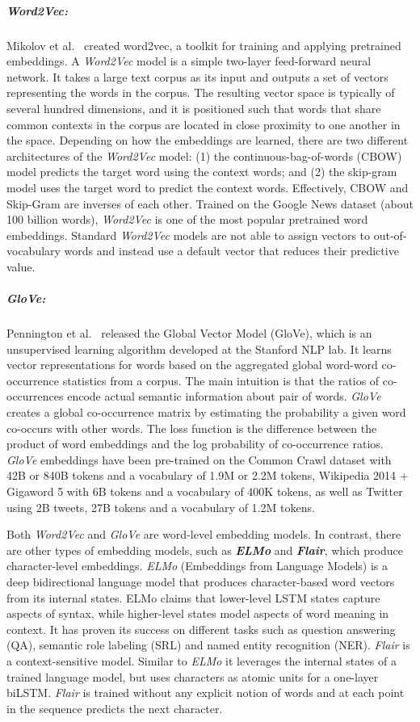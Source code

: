 \subparagraph{\emph{Word2Vec:}} Mikolov et al.~\cite{w2v2013} created word2vec, a toolkit for training and applying pretrained embeddings. A \emph{Word2Vec} model is a simple two-layer feed-forward neural network. It takes a large text corpus as its input and outputs a set of vectors representing the words in the corpus. The resulting vector space is typically of several hundred dimensions, and it is positioned such that words that share common contexts in the corpus are located in close proximity to one another in the space. Depending on how the embeddings are learned, there are two different architectures of the \emph{Word2Vec} model: (1) the continuous-bag-of-words (CBOW) model predicts the target word using the context words; and (2) the skip-gram model uses the target word to predict the context words. Effectively, CBOW and Skip-Gram are inverses of each other. Trained on the Google News dataset (about 100 billion words), \emph{Word2Vec} is one of the most popular pretrained word embeddings. Standard \emph{Word2Vec} models are not able to assign vectors to out-of-vocabulary words and instead use a default vector that reduces their predictive value.

\subparagraph{\emph{GloVe:}} Pennington et al.~\cite{glove2014} released the Global Vector Model (GloVe), which is an unsupervised learning algorithm developed at the Stanford NLP lab. It learns vector representations for words based on the aggregated global word-word co-occurrence statistics from a corpus. The main intuition is that the ratios of co-occurrences encode actual semantic information about pair of words. \emph{GloVe} creates a global co-occurrence matrix by estimating the probability a given word co-occurs with other words. The loss function is the difference between the product of word embeddings and the log probability of co-occurrence ratios. \emph{GloVe} embeddings have been pre-trained on the Common Crawl dataset with 42B or 840B tokens and a vocabulary of 1.9M or 2.2M tokens, Wikipedia 2014 + Gigaword 5 with 6B tokens and a vocabulary of 400K tokens, as well as Twitter using 2B tweets, 27B tokens and a vocabulary of 1.2M tokens.


Both \emph{Word2Vec} and \emph{GloVe} are word-level embedding models. In contrast, there are other types of embedding models, such as \textbf{\emph{ELMo}} and \textbf{\emph{Flair}}, which produce character-level embeddings. \emph{ELMo} (Embeddings from Language Models) \cite{elmo2018} is a deep bidirectional language model that produces character-based word vectors from its internal states. ELMo claims that lower-level LSTM states capture aspects of syntax, while higher-level states model aspects of word meaning in context. It has proven its success on different tasks such as question answering (QA), semantic role labeling (SRL) and named entity recognition (NER). \emph{Flair} \cite{flair2019} is a context-sensitive model. Similar to \emph{ELMo} it leverages the internal states of a trained language model, but uses characters as atomic units for a one-layer biLSTM. \emph{Flair} is trained without any explicit notion of words and at each point in the sequence predicts the next character. 

